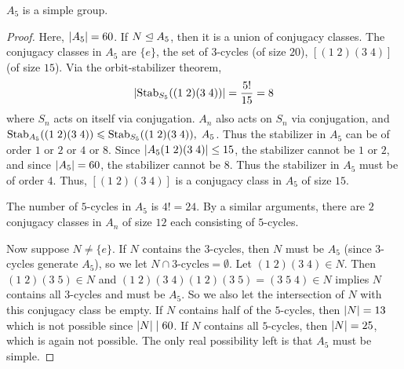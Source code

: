 \begin{theorem}
    $A_{5}$ is a simple group.
\end{theorem}
\begin{proof}
    Here, $\left| A_{5} \right| = 60$. If $N \trianglelefteq A_{5}$, then it is a union of conjugacy classes. The conjugacy classes in $A_{5}$ are $\{e\}$, the set of $3$-cycles (of size $20$), $[(1\;2)(3\;4)]$ (of size $15$). Via the orbit-stabilizer theorem, 
    \begin{align}
        \left| \operatorname{Stab}_{S_{5}}((1\;2)(3\;4)) \right| = \frac{5!}{15} = 8
    \end{align}
    where $S_{n}$ acts on itself via conjugation. $A_{n}$ also acts on $S_{n}$ via conjugation, and $\operatorname{Stab}_{A_{5}}((1\;2)(3\;4)) \leqslant \operatorname{Stab}_{S_{5}}((1\;2)(3\;4)),\; A_{5}$. Thus the stabilizer in $A_{5}$ can be of order $1$ or $2$ or $4$ or $8$. Since $\left| A_{5}(1\;2)(3\;4) \right| \leq 15$, the stabilizer cannot be $1$ or $2$, and since $\left| A_{5} \right| = 60$, the stabilizer cannot be $8$. Thus the stabilizer in $A_{5}$ must be of order $4$. Thus, $[(1\;2)(3\;4)]$ is a conjugacy class in $A_{5}$ of size $15$.

    The number of $5$-cycles in $A_{5}$ is $4! = 24$. By a similar arguments, there are $2$ conjugacy classes in $A_{n}$ of size $12$ each consisting of $5$-cycles.

    Now suppose $N \neq \{e\}$. If $N$ contains the $3$-cycles, then $N$ must be $A_{5}$ (since $3$-cycles generate $A_{5}$), so we let $N \cap \text{$3$-cycles} = \emptyset$. Let $(1\;2)(3\;4) \in N$. Then $(1\;2)(3\;5) \in N$ and $(1\;2)(3\;4)(1\;2)(3\;5) = (3\;5\;4) \in N$ implies $N$ contains all $3$-cycles and must be $A_{5}$. So we also let the intersection of $N$ with this conjugacy class be empty. If $N$ contains half of the $5$-cycles, then $\left| N \right| = 13$ which is not possible since $\left| N \right| \mid 60$. If $N$ contains all $5$-cycles, then $\left| N \right| = 25$, which is again not possible. The only real possibility left is that $A_{5}$ must be simple.
\end{proof}

